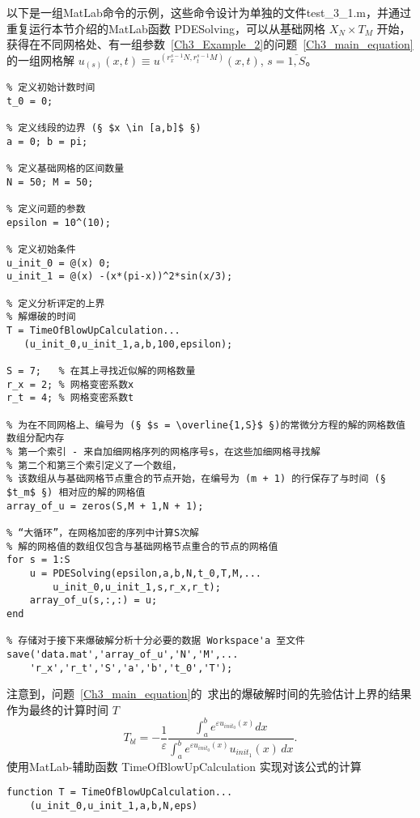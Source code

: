 \documentclass[twoside]{book}
\begin{document}
\begin{CJK*}{GBK}{song}
以下是一组MatLab命令的示例，这些命令设计为单独的文件test\_3\_1.m，并通过重复运行本节介绍的MatLab函数 PDESolving，可以从基础网格 $X_N \times T_M$ 开始，获得在不同网格处、有一组参数~\eqref{Ch3_Example_2}的问题~\eqref{Ch3_main_equation}的一组网格解 $u_{(s)}(x,t) \equiv u^{(r_x^{s - 1}N,r_t^{s - 1}M)}(x,t)$, $s = \overline{1,S}$。 %
%
\begin{lstlisting}
% 定义初始计数时间
t_0 = 0;

% 定义线段的边界 (§ $x \in [a,b]$ §)
a = 0; b = pi;

% 定义基础网格的区间数量
N = 50; M = 50;

% 定义问题的参数
epsilon = 10^(10);

% 定义初始条件
u_init_0 = @(x) 0;
u_init_1 = @(x) -(x*(pi-x))^2*sin(x/3);

% 定义分析评定的上界
% 解爆破的时间
T = TimeOfBlowUpCalculation...
   (u_init_0,u_init_1,a,b,100,epsilon);

S = 7;   % 在其上寻找近似解的网格数量
r_x = 2; % 网格变密系数x
r_t = 4; % 网格变密系数t

% 为在不同网格上、编号为 (§ $s = \overline{1,S}$ §)的常微分方程的解的网格数值数组分配内存
% 第一个索引 - 来自加细网格序列的网格序号s，在这些加细网格寻找解
% 第二个和第三个索引定义了一个数组，
% 该数组从与基础网格节点重合的节点开始，在编号为 (m + 1) 的行保存了与时间 (§ $t_m$ §) 相对应的解的网格值
array_of_u = zeros(S,M + 1,N + 1);

% “大循环”，在网格加密的序列中计算S次解
% 解的网格值的数组仅包含与基础网格节点重合的节点的网格值
for s = 1:S
    u = PDESolving(epsilon,a,b,N,t_0,T,M,...
        u_init_0,u_init_1,s,r_x,r_t);
    array_of_u(s,:,:) = u;
end

% 存储对于接下来爆破解分析十分必要的数据 Workspace'а 至文件
save('data.mat','array_of_u','N','M',...
    'r_x','r_t','S','a','b','t_0','T');
\end{lstlisting}

注意到，问题~\eqref{Ch3_main_equation}的~\cite[公式~(2.5)]{Lukyanenko_1}求出的爆破解时间的先验估计上界的结果作为最终的计算时间 $T$
\begin{equation*}
    T_{bl}=-\frac{1}{\varepsilon}\frac{\int_a^b e^{\varepsilon u_{init_0}(x)}dx}{\int_a^b e^{\varepsilon u_{init_0}(x)}u_{init_1}(x)\,dx}.
%
\end{equation*}
使用MatLab-辅助函数 TimeOfBlowUpCalculation 实现对该公式的计算
%
\begin{lstlisting}
function T = TimeOfBlowUpCalculation...
    (u_init_0,u_init_1,a,b,N,eps)


\end{lstlisting}
\end{CJK*}
\end{document}
